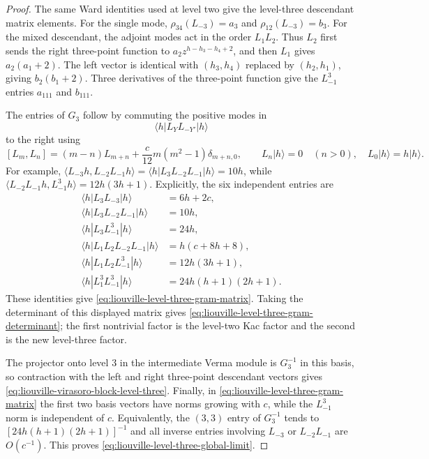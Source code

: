 \begin{proof}
The same Ward identities used at level two give the level-three descendant
matrix elements.  For the single mode,
\(\rho_{34}(L_{-3})=a_3\) and \(\rho_{12}(L_{-3})=b_3\).  For the mixed
descendant, the adjoint modes act in the order \(L_1L_2\).  Thus \(L_2\)
first sends the right three-point function to \(a_2 z^{h-h_3-h_4+2}\), and
then \(L_1\) gives \(a_2(a_1+2)\).  The left vector is identical with
\((h_3,h_4)\) replaced by \((h_2,h_1)\), giving \(b_2(b_1+2)\).  Three
derivatives of the three-point function give the \(L_{-1}^3\) entries
\(a_{111}\) and \(b_{111}\).

The entries of \(G_3\) follow by commuting the positive modes in
\[
  \langle h|L_Y L_{-Y'}|h\rangle
\]
to the right using
\[
  [L_m,L_n]=(m-n)L_{m+n}
  +\frac c{12}m(m^2-1)\delta_{m+n,0},
  \qquad
  L_n|h\rangle=0\quad(n>0),\quad L_0|h\rangle=h|h\rangle .
\]
For example,
\(\langle L_{-3}h,L_{-2}L_{-1}h\rangle
=\langle h|L_3L_{-2}L_{-1}|h\rangle=10h\), while
\(\langle L_{-2}L_{-1}h,L_{-1}^3h\rangle=12h(3h+1)\).  Explicitly, the six
independent entries are
\[
\begin{aligned}
  \langle h|L_3L_{-3}|h\rangle&=6h+2c,\\
  \langle h|L_3L_{-2}L_{-1}|h\rangle&=10h,\\
  \langle h|L_3L_{-1}^3|h\rangle&=24h,\\
  \langle h|L_1L_2L_{-2}L_{-1}|h\rangle&=h(c+8h+8),\\
  \langle h|L_1L_2L_{-1}^3|h\rangle&=12h(3h+1),\\
  \langle h|L_1^3L_{-1}^3|h\rangle&=24h(h+1)(2h+1).
\end{aligned}
\]
These identities give \eqref{eq:liouville-level-three-gram-matrix}.  Taking
the determinant of this displayed matrix gives
\eqref{eq:liouville-level-three-gram-determinant}; the first nontrivial
factor is the level-two Kac factor and the second is the new level-three
factor.

The projector onto level \(3\) in the intermediate Verma module is
\(G_3^{-1}\) in this basis, so contraction with the left and right
three-point descendant vectors gives
\eqref{eq:liouville-virasoro-block-level-three}.  Finally, in
\eqref{eq:liouville-level-three-gram-matrix} the first two basis vectors have
norms growing with \(c\), while the \(L_{-1}^3\) norm is independent of \(c\).
Equivalently, the \((3,3)\) entry of \(G_3^{-1}\) tends to
\([24h(h+1)(2h+1)]^{-1}\) and all inverse entries involving
\(L_{-3}\) or \(L_{-2}L_{-1}\) are \(O(c^{-1})\).  This proves
\eqref{eq:liouville-level-three-global-limit}.
\end{proof}


